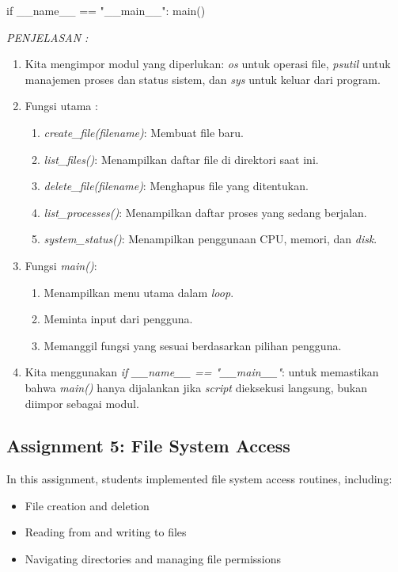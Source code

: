 \documentclass[12pt]{article}
\begin{document}
\begin{enumerate}
\begin{python}
if __name__ == "__main__":
    main()
    \end{python}
    \textit{PENJELASAN :}
    \begin{enumerate}
        \item Kita mengimpor modul yang diperlukan: \textit{os} untuk operasi file, \textit{psutil} untuk manajemen proses dan status sistem, dan \textit{sys} untuk keluar dari program.
        \item Fungsi utama :
        \begin{enumerate}
            \item \textit{create\_file(filename)}: Membuat file baru.
            \item \textit{list\_files()}: Menampilkan daftar file di direktori saat ini.
            \item \textit{delete\_file(filename)}: Menghapus file yang ditentukan.
            \item \textit{list\_processes()}: Menampilkan daftar proses yang sedang berjalan.
            \item \textit{system\_status()}: Menampilkan penggunaan CPU, memori, dan \textit{disk}.
        \end{enumerate}
        \item Fungsi \textit{main()}:
        \begin{enumerate}
            \item Menampilkan menu utama dalam \textit{loop}.
            \item Meminta input dari pengguna.
            \item Memanggil fungsi yang sesuai berdasarkan pilihan pengguna.
        \end{enumerate}
        \item Kita menggunakan \textit{if \_\_name\_\_ == "\_\_main\_\_"}: untuk memastikan bahwa \textit{main()} hanya dijalankan jika \textit{script} dieksekusi langsung, bukan diimpor sebagai modul.
    \end{enumerate}
\end{enumerate}


\subsection{Assignment 5: File System Access}
In this assignment, students implemented file system access routines, including:
\begin{itemize}
    \item File creation and deletion
    \item Reading from and writing to files
    \item Navigating directories and managing file permissions
\end{itemize}
\end{document}
